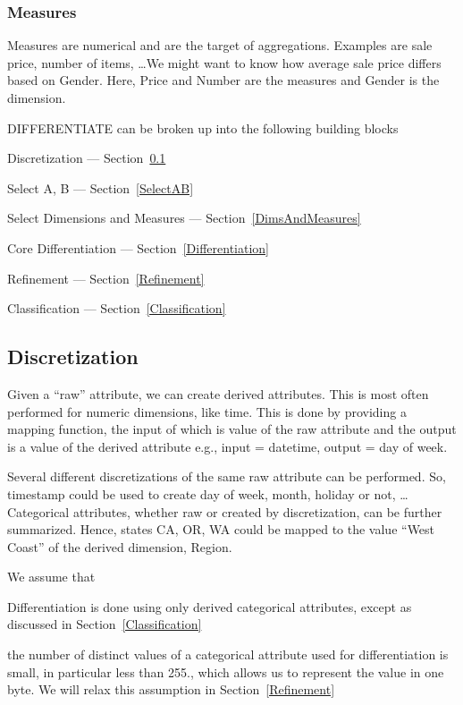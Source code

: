 \subsubsection{Measures}
Measures are numerical and are the target of aggregations. Examples are sale
price, number of items, \ldots We might want to know how average sale price
differs based on Gender. Here, Price and Number are the measures and Gender is
the dimension.

DIFFERENTIATE can be broken up into the following building blocks
\be
\item Discretization --- Section~\ref{Discretization}
\item Select A, B  --- Section~\ref{SelectAB}
\item Select Dimensions and Measures --- Section~\ref{DimsAndMeasures}
\item Core Differentiation  --- Section~\ref{Differentiation}
\item Refinement --- Section~\ref{Refinement}
\item Classification --- Section~\ref{Classification}
\ee

\subsection{Discretization}
\label{Discretization}

Given a ``raw'' attribute, we can create derived attributes. This is most often
performed for numeric dimensions, like time. This is done by providing a mapping
function, the input of which is value of the raw attribute and the output is a
value of the derived attribute e.g., input = datetime, output = day of week.

Several different discretizations of the same raw attribute can be performed.  So, timestamp could be used to create day of week, month, holiday or not, \ldots
Categorical attributes, whether raw or created by discretization, can be further
summarized. Hence, states CA, OR, WA could be mapped to the value ``West Coast''  of the derived dimension, Region.

We assume that 
\be
\item Differentiation is done using only derived categorical attributes, except
as discussed in Section~\ref{Classification}
\item the number of distinct values of a categorical 
attribute used for differentiation is small, in particular less than 255., which
allows us to represent the value in one byte. We will relax this assumption in
Section~\ref{Refinement}

